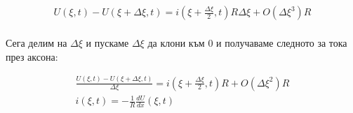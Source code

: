 \documentclass{article}
\begin{document}
    \begin{gather*} 
        U\left(\xi,t\right) - U\left(\xi + \Delta\xi, t\right) = i\left(\xi + \frac{\Delta\xi}{2},t\right)R\Delta\xi +
        O\left(\Delta\xi^3\right)R\\
     \end{gather*}

     Сега делим на $\Delta\xi$ и пускаме $\Delta\xi$ да клони към 0 и получаваме следното за тока през аксона:
     
    \begin{gather*} 
        \frac{U\left(\xi,t\right) - U\left(\xi + \Delta\xi, t\right)}{\Delta\xi} = i\left(\xi + \frac{\Delta\xi}{2},t\right)R +
        O\left(\Delta\xi^2\right)R\\
        i\left(\xi,t\right) = -\frac{1}{R}\frac{dU}{dx}\left(\xi,t\right)
     \end{gather*}




\end{document}

